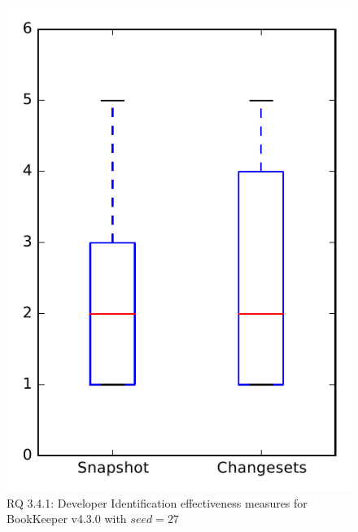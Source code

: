 
\begin{figure}
\centering
\includegraphics[height=0.4\textheight]{figures/dit_seed/rq1_bookkeeper_27}
\caption{RQ 3.4.1: Developer Identification effectiveness measures for BookKeeper v4.3.0 with $seed=27$}
\label{fig:dit_seed:rq1:bookkeeper}
\end{figure}
